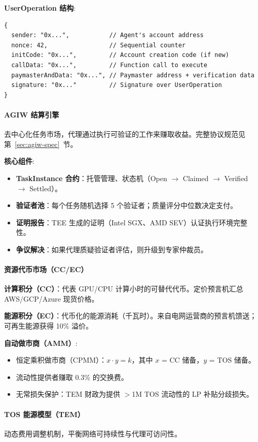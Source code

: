 \documentclass[11pt]{article}
\begin{document}
\textbf{UserOperation 结构}:
\begin{verbatim}
{
  sender: "0x...",           // Agent's account address
  nonce: 42,                 // Sequential counter
  initCode: "0x...",         // Account creation code (if new)
  callData: "0x...",         // Function call to execute
  paymasterAndData: "0x...", // Paymaster address + verification data
  signature: "0x..."         // Signature over UserOperation
}
\end{verbatim}

\paragraph{AGIW 结算引擎}
去中心化任务市场，代理通过执行可验证的工作来赚取收益。完整协议规范见第~\ref{sec:agiw-spec}~节。

\textbf{核心组件}:
\begin{itemize}[noitemsep]
  \item \textbf{TaskInstance 合约}：托管管理、状态机（Open $\to$ Claimed $\to$ Verified $\to$ Settled）。
  \item \textbf{验证者池}：每个任务随机选择 5 个验证者；质量评分中位数决定支付。
  \item \textbf{证明报告}：TEE 生成的证明（Intel SGX、AMD SEV）认证执行环境完整性。
  \item \textbf{争议解决}：如果代理质疑验证者评估，则升级到专家仲裁员。
\end{itemize}

\paragraph{资源代币市场（CC/EC）}
\textbf{计算积分（CC）}：代表 GPU/CPU 计算小时的可替代代币。定价预言机汇总 AWS/GCP/Azure 现货价格。

\textbf{能源积分（EC）}：代币化的能源消耗（千瓦时）。来自电网运营商的预言机馈送；可再生能源获得 10\% 溢价。

\textbf{自动做市商（AMM）}:
\begin{itemize}[noitemsep]
  \item 恒定乘积做市商（CPMM）：$x \cdot y = k$，其中 $x$ = CC 储备，$y$ = TOS 储备。
  \item 流动性提供者赚取 0.3\% 的交换费。
  \item 无常损失保护：TEM 财政为提供 $>$1M TOS 流动性的 LP 补贴分歧损失。
\end{itemize}

\paragraph{TOS 能源模型（TEM）}
动态费用调整机制，平衡网络可持续性与代理可访问性。
\end{document}

